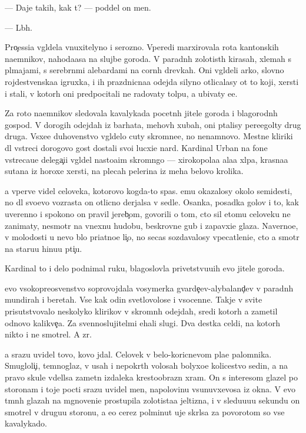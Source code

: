 \documentclass[10pt]{book}
\begin{document}
— Daje takih, kak t{\yi}? — poddel on men{\ia}.

— L{\iu}b{\yi}h.

Pro{\c}essi{\y}a v{\yi}gl{\ia}dela vnuxitelyno i ser{\y}ozno. Vperedi marxirovala rota kantonskih na{\y}emnikov, nahod{\ia}{\x}a{\y}asa na slujbe goroda. V paradn{\yi}h zolotist{\yi}h kirasah, xlemah s pl{\iu}majami, s serebr{\ia}n{\yi}mi alebardami na corn{\yi}h drevkah. Oni v{\yi}gl{\ia}deli {\y}arko, slovno rojdestvenska{\y}a igruxka, i ih prazdnicna{\y}a odejda silyno otlicalasy ot to{\y} koji, xersti i stali, v kotor{\yi}h oni predpocitali ne radovaty tolpu, a ubivaty {\y}e{\y}e.

Za roto{\y} na{\y}emnikov sledovala kavalykada pocetn{\yi}h jitele{\y} goroda i blagorodn{\yi}h gospod. V dorogih odejdah iz barhata, mehov{\yi}h xubah, oni p{\yi}talisy pere{\x}egol{\ia}ty drug druga. V{\yi}sxe{\y}e duhovenstvo v{\yi}gl{\ia}delo cuty skromne{\y}e, no nenamnovo. Mestn{\yi}{\y}e kliriki dl{\ia} vstreci dorogovo gost{\ia} dostali svo{\y}i lucxi{\y}e nar{\ia}d{\yi}. Kardinal Urban na fone vstreca{\y}u{\x}e{\y} delega{\c}i{\y}i v{\yi}gl{\ia}del nasto{\y}a{\x}im skromn{\ia}go{\y} — xirokopola{\y}a ala{\y}a xl{\ia}pa, krasna{\y}a sutana iz horoxe{\y} xersti, na plecah pelerina iz meha belovo krolika.

{\Y}a vperv{\yi}{\y}e videl celoveka, kotorovo kogda-to spas. {\Y}emu okazalosy okolo semides{\ia}ti, no dl{\ia} svo{\y}evo vozrasta on otlicno derjalsa v sedle. Osanka, posadka golov{\yi} i to, kak uverenno i spoko{\y}no on pravil jereb{\c}om, govorili o tom, cto sil etomu celoveku ne zanimaty, nesmotr{\ia} na vnexn{\iu}{\y}u hudobu, beskrovn{\yi}{\y}e gub{\yi} i zapavxi{\y}e glaza. Naverno{\y}e, v molodosti u nevo b{\yi}lo pri{\y}atno{\y}e li{\c}o, no se{\y}cas sozdavalosy vpecatleni{\y}e, cto {\y}a smotr{\iu} na staru{\y}u hi{\x}nu{\y}u pti{\c}u.

Kardinal to i delo podnimal ruku, blagoslovl{\ia}{\y}a privetstvu{\y}u{\x}ih {\y}evo jitele{\y} goroda.

{\Y}evo v{\yi}sokopreosv{\ia}{\x}enstvo soprovojdala vosymerka gvarde{\y}{\c}ev-alybaland{\c}ev v paradn{\yi}h mundirah i beretah. Vse kak odin svetlovolos{\yi}{\y}e i v{\yi}socenn{\yi}{\y}e. Takje v svite prisutstvovalo neskolyko klirikov v skromn{\yi}h odejdah, sredi kotor{\yi}h {\y}a zametil odnovo kalikve{\c}a. Za sv{\ia}{\x}ennoslujitel{\ia}mi {\y}ehali slugi. Dva des{\ia}tka cel{\ia}di, na kotor{\yi}h nikto i ne smotrel. A zr{\ia}.

{\Y}a srazu uvidel tovo, kovo jdal. Celovek v belo-koricnevom pla{\x}e palomnika. Smugloli{\c}i{\y}, temnoglaz{\yi}{\y}, v usah i nepokr{\yi}t{\yi}h volosah bolyxo{\y}e kolicestvo sedin{\yi}, a na pravo{\y} skule v{\yi}del{\ia}lsa zametn{\yi}{\y} izdaleka krestoobrazn{\yi}{\y} xram. On s interesom glazel po storonam i toje pocti srazu uvidel men{\ia}, napolovinu v{\yi}sunuvxevosa iz okna. V {\y}evo t{\e}mn{\yi}h glazah na mgnoveni{\y}e prostupila zolotista{\y}a jeltizna, i v sledu{\y}u{\x}u{\y}u sekundu on smotrel v drugu{\y}u storonu, a {\y}e{\x}o cerez polminut{\yi} uje skr{\yi}lsa za povorotom so vse{\y} kavalykado{\y}.
\end{document}
